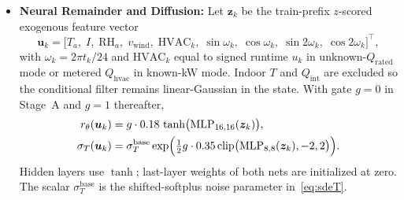 \documentclass[11pt,letterpaper]{article}
\begin{document}
\begin{itemize}
\begin{equation}
\label{eq:fourier-occ}
\mu(t) = \mathrm{softplus}\Biggl( a_0 + \sum_{k=1}^{3} \Bigl[ a_k \sin\Bigl(\frac{2\pi k t}{24}\Bigr) + b_k \cos\Bigl(\frac{2\pi k t}{24}\Bigr) \Bigr] \Biggr).
\end{equation}
The digital-twin \emph{plant} instead mean-reverts to a diurnal schedule of Gaussian occupancy bumps (Section~\ref{sec:results-setup}); the Fourier $\mu(t)$ is therefore misspecified relative to the plant.
\item \textbf{Neural Remainder and Diffusion:} Let $\bm{z}_k$ be the train-prefix $z$-scored exogenous feature vector
\begin{equation}
\label{eq:features}
\bm{u}_k = \bigl[T_a,\; I,\; \mathrm{RH}_a,\; v_\mathrm{wind},\; \mathrm{HVAC}_k,\; \sin\omega_k,\; \cos\omega_k,\; \sin 2\omega_k,\; \cos 2\omega_k\bigr]^\top,
\end{equation}
with $\omega_k = 2\pi t_k/24$ and $\mathrm{HVAC}_k$ equal to signed runtime $u_k$ in unknown-$Q_\mathrm{rated}$ mode or metered $Q_\mathrm{hvac}$ in known-kW mode. Indoor $T$ and $Q_\mathrm{int}$ are excluded so the conditional filter remains linear-Gaussian in the state. With gate $g=0$ in Stage~A and $g=1$ thereafter,
\begin{align}
\label{eq:remainder-net}
r_\theta(\bm{u}_k) &= g\cdot 0.18\,\tanh\bigl(\mathrm{MLP}_{16,16}(\bm{z}_k)\bigr), \\
\label{eq:sigma-net}
\sigma_T(\bm{u}_k) &= \sigma_T^{\mathrm{base}}\exp\Bigl(\tfrac12 g\cdot 0.35\,\mathrm{clip}\bigl(\mathrm{MLP}_{8,8}(\bm{z}_k),-2,2\bigr)\Bigr).
\end{align}
Hidden layers use $\tanh$; last-layer weights of both nets are initialized at zero. The scalar $\sigma_T^{\mathrm{base}}$ is the shifted-softplus noise parameter in~\eqref{eq:sdeT}.
\end{itemize}
\end{document}
